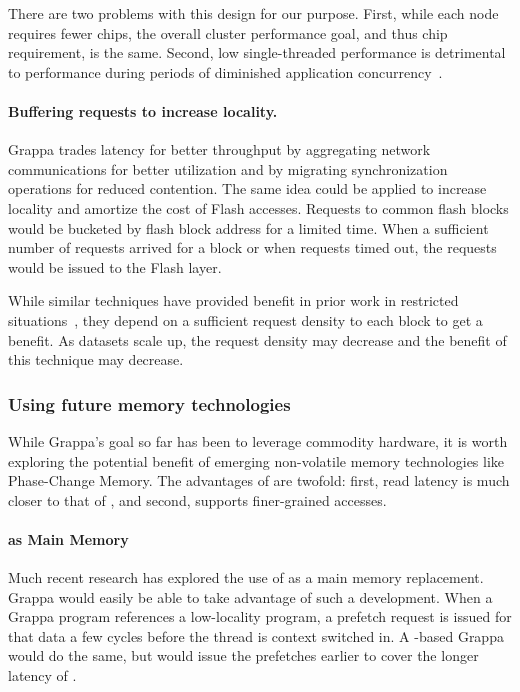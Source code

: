 There are two problems with this design for our purpose. First, while each node
requires fewer chips, the overall cluster performance goal, and thus
chip requirement, is the same. Second, low single-threaded performance is detrimental to performance during periods of diminished application concurrency~\cite{feo:xmt}.

\paragraph{Buffering requests to increase locality.}
Grappa trades latency for better throughput by aggregating network
communications for better utilization and by migrating synchronization
operations for reduced contention. The same idea could be applied to
increase locality and amortize the cost of Flash accesses. Requests
to common flash blocks would be bucketed by flash block address for a
limited time. When a sufficient number of requests arrived for a block
or when requests timed out, the requests would be issued to the Flash
layer.

While similar techniques have provided benefit in prior work in
restricted situations~\cite{magt:2010,graphchi:osdi12}, they depend on a sufficient request
density to each block to get a benefit. As datasets scale up, the
request density may decrease and the benefit of this technique may
decrease.

\subsubsection{Using future memory technologies}

While Grappa's goal so far has been to leverage commodity hardware, it
is worth exploring the potential benefit of emerging non-volatile
memory technologies like Phase-Change Memory. The advantages of 
are twofold: first, read latency is much closer to that of , and
second,  supports finer-grained accesses.

\paragraph{ as Main Memory}
Much recent research has explored the use of  as a main memory
replacement. Grappa would easily be able to take advantage of such a
development. When a Grappa program references a low-locality program,
a prefetch request is issued for that data a few cycles before the
thread is context switched in. A -based
Grappa would do the same, but would issue the prefetches earlier to
cover the longer latency of .

